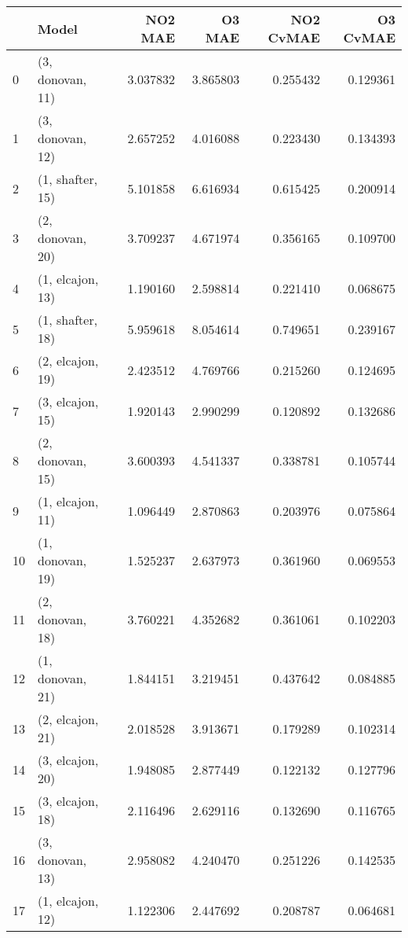 \begin{tabular}{llrrrr}
\toprule
{} &             Model &   NO2 MAE &    O3 MAE &  NO2 CvMAE &  O3 CvMAE \\
\midrule
0  &  (3, donovan, 11) &  3.037832 &  3.865803 &   0.255432 &  0.129361 \\
1  &  (3, donovan, 12) &  2.657252 &  4.016088 &   0.223430 &  0.134393 \\
2  &  (1, shafter, 15) &  5.101858 &  6.616934 &   0.615425 &  0.200914 \\
3  &  (2, donovan, 20) &  3.709237 &  4.671974 &   0.356165 &  0.109700 \\
4  &  (1, elcajon, 13) &  1.190160 &  2.598814 &   0.221410 &  0.068675 \\
5  &  (1, shafter, 18) &  5.959618 &  8.054614 &   0.749651 &  0.239167 \\
6  &  (2, elcajon, 19) &  2.423512 &  4.769766 &   0.215260 &  0.124695 \\
7  &  (3, elcajon, 15) &  1.920143 &  2.990299 &   0.120892 &  0.132686 \\
8  &  (2, donovan, 15) &  3.600393 &  4.541337 &   0.338781 &  0.105744 \\
9  &  (1, elcajon, 11) &  1.096449 &  2.870863 &   0.203976 &  0.075864 \\
10 &  (1, donovan, 19) &  1.525237 &  2.637973 &   0.361960 &  0.069553 \\
11 &  (2, donovan, 18) &  3.760221 &  4.352682 &   0.361061 &  0.102203 \\
12 &  (1, donovan, 21) &  1.844151 &  3.219451 &   0.437642 &  0.084885 \\
13 &  (2, elcajon, 21) &  2.018528 &  3.913671 &   0.179289 &  0.102314 \\
14 &  (3, elcajon, 20) &  1.948085 &  2.877449 &   0.122132 &  0.127796 \\
15 &  (3, elcajon, 18) &  2.116496 &  2.629116 &   0.132690 &  0.116765 \\
16 &  (3, donovan, 13) &  2.958082 &  4.240470 &   0.251226 &  0.142535 \\
17 &  (1, elcajon, 12) &  1.122306 &  2.447692 &   0.208787 &  0.064681 \\
\bottomrule
\end{tabular}
